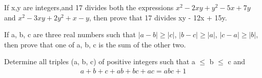 \item If x,y are integers,and 17 divides both the expressions $x^2 - 2xy + y^2 - 5x + 7y$ and 
$x^2 - 3xy + 2y^2 + x - y$, then prove that 17 divides xy - 12x + 15y.

\item If a, b, c are three real numbers such that $|a-b| \geq |c|$, $|b-c| \geq |a|$, $|c-a| \geq |b|$, then prove that one of a, b, c is the sum of the other two.

\item Determine all triples (a, b, c) of positive integers such that a $\leq$ b $\leq$ c and 
\begin{align*}
a + b + c + ab + bc + ac = abc + 1
\end{align*}
